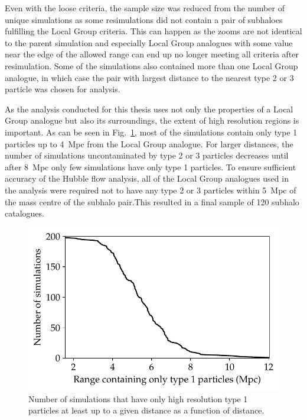 \documentclass[english, twoside]{HYgradu}
\begin{document}
Even with the loose criteria, the sample size was reduced from the number of unique simulations as some resimulations did not contain a pair of subhaloes fulfilling the Local Group criteria. This can happen as the zooms are not identical to the parent simulation and especially Local Group analogues with some value near the edge of the allowed range can end up no longer meeting all criteria after resimulation. Some of the simulations also contained more than one Local Group analogue, in which case the pair with largest distance to the nearest type 2 or 3 particle was chosen for analysis.

As the analysis conducted for this thesis uses not only the properties of a Local Group analogue but also its surroundings, the extent of high resolution regions is important. As can be seen in Fig.\ \ref{fig:uncontaminatedDistances}, most of the simulations contain only type 1 particles up to 4~Mpc from the Local Group analogue. For larger distances, the number of simulations uncontaminated by type 2 or 3 particles decreases until after 8~Mpc only few simulations have only type 1 particles. To ensure sufficient accuracy of the Hubble flow analysis, all of the Local Group analogues used in the analysis were required not to have any type 2 or 3 particles within 5~Mpc of the mass centre of the subhalo pair.This resulted in a final sample of 120 subhalo catalogues.


\begin{figure}
    \centering
    \includegraphics{kuvat/uncontaminatedDistances.pdf}
    \caption{Number of simulations that have only high resolution type 1 particles at least up to a given distance as a function of distance.}\label{fig:uncontaminatedDistances}
\end{figure}
\end{document}
